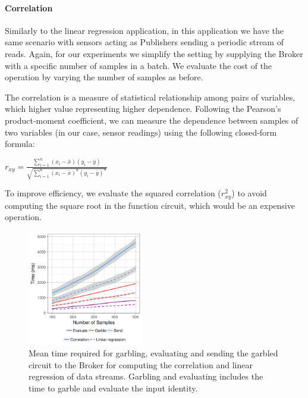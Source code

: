 \paragraph{Correlation}



Similarly to the linear regression application, in this application we have the
same scenario with sensors acting as Publishers sending a periodic stream of
reads.  Again, for our experiments we simplify the setting by supplying the
Broker with a specific number of samples in a batch.  We evaluate the cost of
the operation by varying the number of samples as before.

The correlation is a measure of statistical relationship among pairs of
variables, which higher value representing higher dependence.  Following the
Pearson's product-moment coefficient, we can measure the dependence between
samples of two variables (in our case, sensor readings) using the following
closed-form formula:

$r_{xy} = \frac{\displaystyle\sum_{i=1}^n (x_i - \bar{x}) (y_i - \bar{y})}
{\sqrt{\displaystyle\sum_{i=1}^n (x_i - \bar{x})^n (y_i - \bar{y})^n}}$

To improve efficiency, we evaluate the squared correlation ($r_{xy}^2$) to avoid
computing the square root in the function circuit, which would be an expensive
operation.

\begin{figure}
  \includegraphics[width=0.45\textwidth]{plots/stream.png}
  \caption{Mean time required for garbling, evaluating and sending the garbled
  circuit to the Broker for computing the correlation and linear regression of
  data streams.  Garbling and evaluating
  includes the time to garble and evaluate the input identity.}
  \label{stream-times}
\end{figure}

